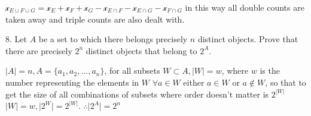 $\mathscr{x}_{E \cup F \cup G} = \mathscr{x}_{E} + \mathscr{x}_{F} +  \mathscr{x}_{G} - \mathscr{x}_{E \cap F} - \mathscr{x}_{E \cap G} - \mathscr{x}_{F \cap G}$ in this way all double counts are taken away and triple counts are also dealt with.

8. Let $A$ be a set to which there belongs precisely $n$ distinct objects. Prove that there are precisely $2^n$ distinct objects that belong to $2^{A}$.

$\lvert{A}\rvert = n, A = \{a_{1}, a_{2}, ..., a_{n} \}$, for all subsets $W \subset A, \lvert{W}\rvert = w$, 
where $w$ is the number representing the elements in $W$
$\forall a \in W$ either $a \in W$ or $a \not \in W$, so that to get the size of all combinations of subsets where order doesn't matter is $2^{\lvert{W}\rvert}$
$\lvert{W}\rvert =w,\lvert{2^{W}}\rvert=  2^{\lvert{W}\rvert}$.
$\therefore \lvert{2^{A}}\rvert = 2^{n}$ 
